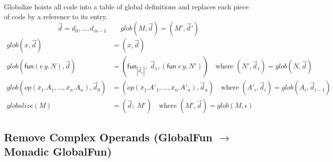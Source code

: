 \documentclass[10pt]{article}
\theoremstyle{acmplain}
\newcommand{\key}[1]{\mathsf{#1}}
\newcommand{\pass}[1]{\mathit{#1}}
\newcommand{\fun}[1]{\key{fun}(#1)}
\newcommand{\funref}[1]{\key{fun}_{#1}}
\begin{document}
Globalize hoists all code into a table of global definitions and replaces each piece of code by a reference to its entry.
\[
  \vec{d} = d_0, \ldots, d_{m-1}
  \qquad
  \pass{glob}(M, \vec{d}) = (M', \vec{d}')
\]
\begin{align*}
  \pass{glob}(x, \vec{d}) &= (x, \vec{d}) \\
  \pass{glob}(\fun{e\,y.\,N}, \vec{d}) &= (\funref{|\vec{d}_1|},\; \vec{d}_1, (\key{fun}\; e\,y.\,N'))
     \quad\text{where } (N', \vec{d}_1) = \pass{glob}(N, \vec{d}) \\
  \pass{glob}(\mathit{op}(\bar{x}_1.A_1, \ldots, \bar{x}_n.A_n), \vec{d}_0)
     &= (\mathit{op}(\bar{x}_1.A'_1, \ldots, \bar{x}_n.A'_n), \vec{d}_n)
     \quad\text{where } (A'_i, \vec{d}_i) = \pass{glob}(A_i, \vec{d}_{i-1}) \\[1ex]
  \pass{globalize}(M) &= (\vec{d};\; M') \quad\text{where } (M', \vec{d}) = \pass{glob}(M, \epsilon)
\end{align*}

\subsection{Remove Complex Operands (GlobalFun \texorpdfstring{$\to$}{->} Monadic GlobalFun)}
\end{document}
